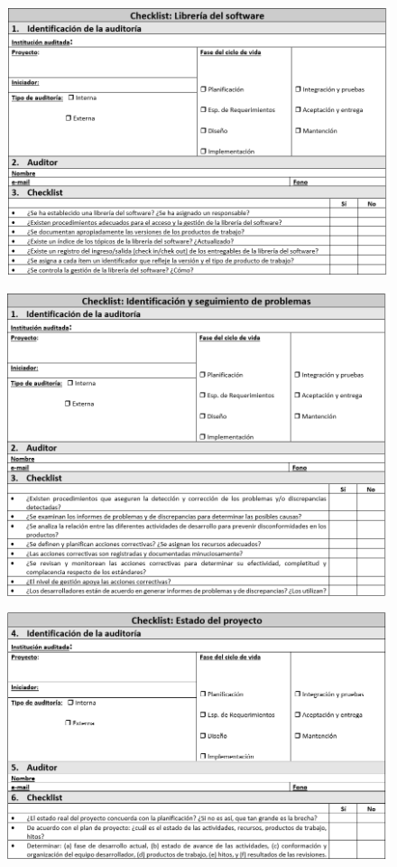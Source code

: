 \begin{figure}[H]
\centering
\includegraphics[width=1\textwidth]{figures/anexos/5-4.PNG}
\end{figure}

\begin{figure}[H]
\centering
\includegraphics[width=1\textwidth]{figures/anexos/5-5.PNG}
\end{figure}

\begin{figure}[H]
\centering
\includegraphics[width=1\textwidth]{figures/anexos/5-6.PNG}
\end{figure}

